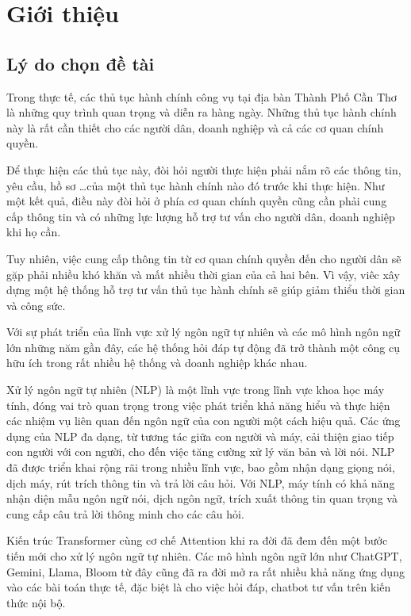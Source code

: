 \documentclass[a4paper, 12pt, openany]{book}
\renewcommand{\headrulewidth}{0pt}
\renewcommand{\headrulewidth}{0pt}
\begin{document}
\printacronyms[name={Danh mục từ viết tắt}]

\renewcommand{\headrulewidth}{1pt} %

\chapter{Giới thiệu}

\section{Lý do chọn đề tài}

Trong thực tế, các thủ tục hành chính công vụ tại địa bàn Thành Phố Cần Thơ là những quy trình quan trọng và
diễn ra hàng ngày. Những thủ tục hành chính này là rất cần thiết cho các người dân, doanh nghiệp và cả các
cơ quan chính quyền.

Để thực hiện các thủ tục này, đòi hỏi người thực hiện phải nắm rõ các thông tin, yêu cầu, hồ sơ \dots của một thủ tục hành chính
nào đó trước khi thực hiện. Như một kết quả, điều này đòi hỏi ở phía cơ quan chính quyền cũng cần phải cung cấp thông tin
và có những lực lượng hỗ trợ tư vấn cho người dân, doanh nghiệp khi họ cần.

Tuy nhiên, việc cung cấp thông tin từ cơ quan chính quyền đến cho người dân sẽ gặp phải nhiều khó khăn và mất nhiều thời gian của cả hai bên.
Vì vậy, viêc xây dựng một hệ thống hỗ trợ tư vấn thủ tục hành chính sẽ giúp giảm thiểu thời gian và công sức.

Với sự phát triển của lĩnh vực xử lý ngôn ngữ tự nhiên và các mô hình ngôn ngữ lớn những năm gần đây, 
các hệ thống hỏi đáp tự động đã trở thành một công cụ hữu ích trong rất nhiều hệ thống và doanh nghiệp khác nhau.

Xử lý ngôn ngữ tự nhiên (NLP) là một lĩnh vực trong lĩnh vực khoa học máy tính, đóng vai trò quan trọng trong việc phát triển khả năng hiểu và thực hiện các nhiệm vụ liên quan đến ngôn ngữ của con người một cách hiệu quả. Các ứng dụng của NLP đa dạng, từ tương tác giữa con người và máy, cải thiện giao tiếp con người với con người, cho đến việc tăng cường xử lý văn bản và lời nói. NLP đã được triển khai rộng rãi trong nhiều lĩnh vực, bao gồm nhận dạng giọng nói, dịch máy, rút trích thông tin và trả lời câu hỏi. Với NLP, máy tính có khả năng nhận diện mẫu ngôn ngữ nói, dịch ngôn ngữ, trích xuất thông tin quan trọng và cung cấp câu trả lời thông minh cho các câu hỏi.

Kiến trúc Transformer cùng cơ chế Attention khi ra đời đã đem đến một bước tiến mới cho
xử lý ngôn ngữ tự nhiên. Các mô hình ngôn ngữ lớn như ChatGPT, Gemini, Llama, Bloom từ đây cũng đã ra đời mở ra rất nhiều khả năng ứng dụng vào các bài toán thực tế,
đặc biệt là cho việc hỏi đáp, chatbot tư vấn trên kiến thức nội bộ.
\end{document}
